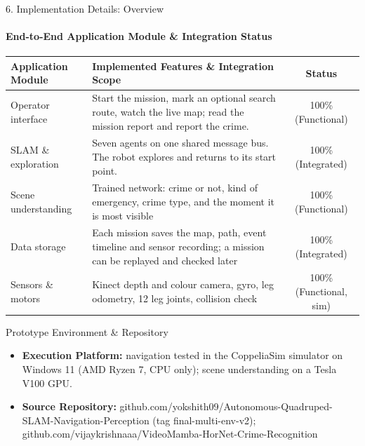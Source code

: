 \documentclass[aspectratio=169, 11pt]{beamer}
\begin{document}
\begin{frame}{6. Implementation Details: Overview}
    \framesubtitle{End-to-End Application Module \& Integration Status}
    \begin{table}
        \centering
        \scriptsize
        \renewcommand{\arraystretch}{1.2}
        \begin{tabular}{p{3.4cm} p{7.4cm} c}
            \toprule
            \textbf{Application Module} & \textbf{Implemented Features \& Integration Scope} & \textbf{Status} \\
            \midrule
            Operator interface & Start the mission, mark an optional search route, watch the live map; read the mission report and report the crime.& 100\% (Functional) \\
            SLAM \& exploration & Seven agents on one shared message bus. The robot explores and returns to its start point. & 100\% (Integrated) \\
            Scene understanding & Trained network: crime or not, kind of emergency, crime type, and the moment it is most visible & 100\% (Functional) \\
            Data storage & Each mission saves the map, path, event timeline and sensor recording; a mission can be replayed and checked later & 100\% (Integrated) \\
            Sensors \& motors & Kinect depth and colour camera, gyro, leg odometry, 12 leg joints, collision check & 100\% (Functional, sim) \\
            \bottomrule
        \end{tabular}
    \end{table}

    \begin{block}{Prototype Environment \& Repository}
        \footnotesize
        \begin{itemize}
            \item \textbf{Execution Platform:} navigation tested in the CoppeliaSim simulator on Windows 11 (AMD Ryzen 7, CPU only); scene understanding on a Tesla V100 GPU.
            \item \textbf{Source Repository:} github.com/yokshith09/Autonomous-Quadruped-SLAM-Navigation-Perception (tag final-multi-env-v2); github.com/vijaykrishnaaa/VideoMamba-HorNet-Crime-Recognition
        \end{itemize}
    \end{block}
\end{frame}
\end{document}
